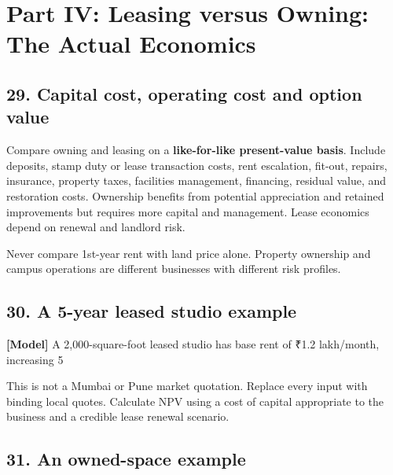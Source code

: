 \section*{Part IV: Leasing versus Owning: The Actual Economics}


\subsection{29. Capital cost, operating cost and option value}

Compare owning and leasing on a \textbf{like-for-like present-value basis}. Include deposits, stamp duty or lease transaction costs, rent escalation, fit-out, repairs, insurance, property taxes, facilities management, financing, residual value, and restoration costs. Ownership benefits from potential appreciation and retained improvements but requires more capital and management. Lease economics depend on renewal and landlord risk.

Never compare 1st-year rent with land price alone. Property ownership and campus operations are different businesses with different risk profiles.


\subsection{30. A 5-year leased studio example}

\textbf{[Model]} A 2,000-square-foot leased studio has base rent of \textnormal{₹}1.2 lakh/month, increasing 5%

This is not a Mumbai or Pune market quotation. Replace every input with binding local quotes. Calculate NPV using a cost of capital appropriate to the business and a credible lease renewal scenario.


\subsection{31. An owned-space example}

